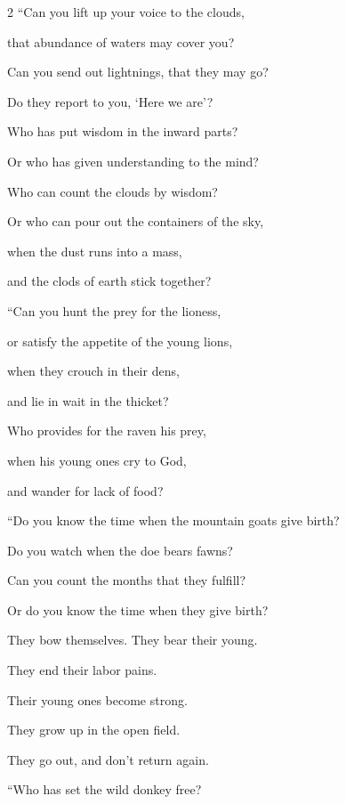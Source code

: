 \begin{multicols}{2}
	\myverse{}“Can you lift up your voice to the clouds,
	
	that abundance of waters may cover you?
	
	\myverse{}Can you send out lightnings, that they may go?
	
	Do they report to you, ‘Here we are’?
	
	\myverse{}Who has put wisdom in the inward parts?
	
	Or who has given understanding to the mind?
	
	\myverse{}Who can count the clouds by wisdom?
	
	Or who can pour out the containers of the sky,
	
	\myverse{}when the dust runs into a mass,
	
	and the clods of earth stick together?
	
	\vspace{\baselineskip}
	
	\myverse{}“Can you hunt the prey for the lioness,
	
	or satisfy the appetite of the young lions,
	
	\myverse{}when they crouch in their dens,
	
	and lie in wait in the thicket?
	
	\myverse{}Who provides for the raven his prey,
	
	when his young ones cry to God,
	
	and wander for lack of food?
	
	
	
	\mychapter{} \myverse*{}“Do you know the time when the mountain goats give birth?
	
	\quad\quad Do you watch when the doe bears fawns?
	
	\myverse{}Can you count the months that they fulfill?
	
	Or do you know the time when they give birth?
	
	\myverse{}They bow themselves. They bear their young.
	
	They end their labor pains.
	
	\myverse{}Their young ones become strong.
	
	They grow up in the open field.
	
	They go out, and don’t return again.
	
	\vspace{\baselineskip}
	
	\myverse{}“Who has set the wild donkey free?
	

\end{multicols}
